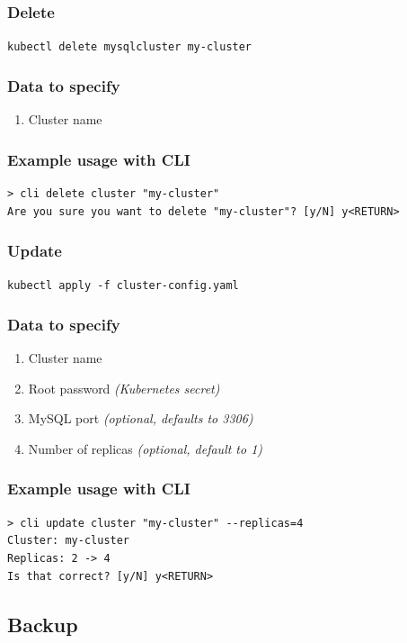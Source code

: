 \subsubsection{Delete}
\texttt{kubectl delete mysqlcluster my-cluster}

\subsubsection{Data to specify}
\begin{enumerate}
	\item Cluster name
\end{enumerate}

\subsubsection{Example usage with CLI}
\begin{lstlisting}
> cli delete cluster "my-cluster"
Are you sure you want to delete "my-cluster"? [y/N] y<RETURN>
\end{lstlisting}

\subsubsection{Update}
\texttt{kubectl apply -f cluster-config.yaml}

\subsubsection{Data to specify}
\begin{enumerate}
	\item Cluster name
	\item Root password \textit{(Kubernetes secret)}
	\item MySQL port \textit{(optional, defaults to 3306)}
	\item Number of replicas \textit{(optional, default to 1)}
\end{enumerate}

\subsubsection{Example usage with CLI}
\begin{lstlisting}
> cli update cluster "my-cluster" --replicas=4
Cluster: my-cluster
Replicas: 2 -> 4
Is that correct? [y/N] y<RETURN>
\end{lstlisting}

\subsection{Backup}


